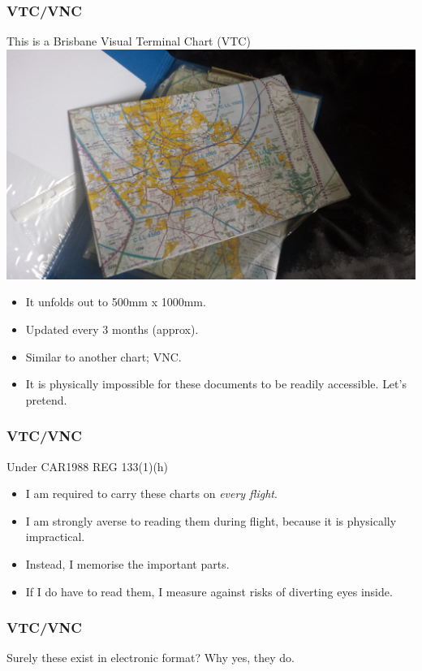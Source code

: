 \begin{frame}
\frametitle{VTC/VNC}
\begin{block}{This is a Brisbane Visual Terminal Chart (VTC)}
\includegraphics[height=0.3\textheight]{image/vtc.png}
\begin{itemize}
\item<1-> It unfolds out to 500mm x 1000mm.
\item<2-> Updated every 3 months (approx).
\item<3-> Similar to another chart; VNC.
\item<4-> It is physically impossible for these documents to be readily accessible. \tiny{Let's pretend.}
\end{itemize}
\end{block}
\end{frame}

\begin{frame}
\frametitle{VTC/VNC}
\begin{block}{Under CAR1988 REG 133(1)(h)}
\begin{itemize}
\item<1-> I am required to carry these charts on \emph{every flight}.
\item<2-> I am strongly averse to reading them during flight, because it is physically impractical.
\item<3-> Instead, I memorise the important parts.
\item<4-> If I do have to read them, I measure against risks of diverting eyes inside.
\end{itemize}
\end{block}
\end{frame}

\begin{frame}
\frametitle{VTC/VNC}
\begin{block}{Surely these exist in electronic format?}
Why yes, they do.
\end{block}
\end{frame}

